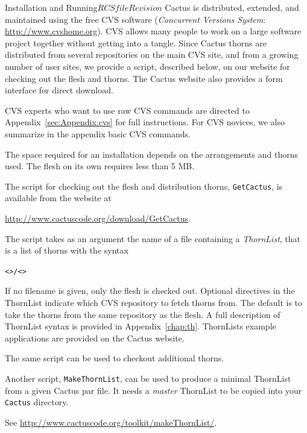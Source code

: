 \begin{cactuspart}{Installation and Running}{$RCSfile$}{$Revision$}
Cactus is distributed, extended, and maintained using the free CVS
software (\textit{Concurrent Versions System}: \url{http://www.cvshome.org}).
CVS  allows many people to work on a large software project
together without getting into a tangle.
Since Cactus thorns are distributed from several repositories on the
main CVS site, and from a growing number of user sites, we provide a
script, described below,  on our website for checking out the flesh and thorns.
The Cactus website also provides a form interface for direct download.

CVS experts who want to use raw CVS commands are directed to
Appendix~\ref{sec:Appendix.cvs} for full instructions. For CVS novices,
we also summarize in the appendix basic CVS commands.

The space required for an installation depends on the arrangements and
thorns used. The flesh on its own requires less than 5 MB.

The script for checking out the flesh and distribution thorns,
\texttt{GetCactus}, is available from the website at

\begin{center}
\url{http://www.cactuscode.org/download/GetCactus}.
\end{center}

The
script takes as an argument the name of a file containing a \textit{ThornList},
that is a list of thorns with the syntax

\begin{alltt}
<>/<>
\end{alltt}

If no filename is given, only the flesh is checked out.
Optional directives in the ThornList indicate which CVS repository to fetch
thorns from. The default is to take the thorns from the same repository as
the flesh. A full description of ThornList syntax is provided in Appendix~\ref{chap:th}.
ThornLists example applications are provided on the Cactus website.

The same script can be used to checkout additional thorns.

Another script, \texttt{MakeThornList}, can be used to produce a minimal
ThornList from a given Cactus par file.  It needs a \emph{master} ThornList
to be copied into your \texttt{Cactus} directory.

See \url{http://www.cactuscode.org/toolkit/makeThornList/}.




\end{cactuspart}
